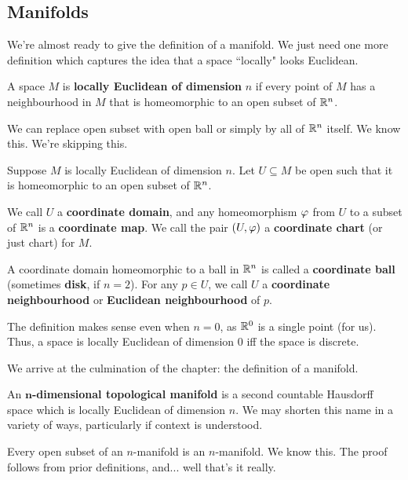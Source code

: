 \subsection{Manifolds}

We're almost ready to give the definition of a manifold. We just need one more
definition which captures the idea that a space ``locally" looks Euclidean.

\begin{defn}
    A space $ M $ is \textbf{locally Euclidean of dimension} $ n $ if every
    point of $ M $ has a neighbourhood in $ M $ that is homeomorphic to an open
    subset of $ \mathbb{R}^{n} $.
\end{defn}

We can replace open subset with open ball or simply by all of $ \mathbb{R}^{n} $ itself.
We know this. We're skipping this.

\begin{defn}
    Suppose $ M $ is locally Euclidean of dimension $ n $. Let $ U \subseteq M $
    be open such that it is homeomorphic to an open subset of $ \mathbb{R}^{n} $.

    We call $ U $ a \textbf{coordinate domain}, and any homeomorphism $ \varphi $
    from $ U $ to a subset of $ \mathbb{R}^{n} $ is a \textbf{coordinate map}.
    We call the pair $ (U, \varphi) $ a \textbf{coordinate chart} (or just chart)
    for $ M $.

    A coordinate domain homeomorphic to a ball in $ \mathbb{R}^{n} $ is
    called a \textbf{coordinate ball} (sometimes \textbf{disk}, if $ n=2 $). For
    any $ p \in U $, we call $ U $ a \textbf{coordinate neighbourhood} or
    \textbf{Euclidean neighbourhood} of $ p $.
\end{defn}

The definition makes sense even when $ n=0 $, as $ \mathbb{R}^{0} $ is a single point
(for us). Thus, a space is locally Euclidean of dimension 0 iff the space is
discrete.

We arrive at the culmination of the chapter: the definition of a manifold.

\begin{defn}
    An $ \bm{n} $\textbf{-dimensional topological manifold} is a second countable
    Hausdorff space which is locally Euclidean of dimension $ n $. We may shorten
    this name in a variety of ways, particularly if context is understood.
\end{defn}

Every open subset of an $ n $-manifold is an $ n $-manifold. We know this.
The proof follows from prior definitions, and... well that's it really.

